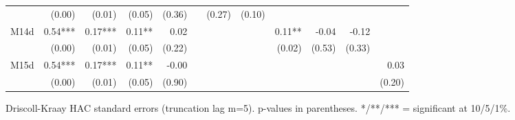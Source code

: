 \begin{table}[htbp]
{\begin{tabular}{lrrrrrrrrrrr}
 & (0.00) & (0.01) & (0.05) & (0.36) &  & (0.27) & (0.10) &  &  &  &  \\
M14d & 0.54*** & 0.17*** & 0.11** & 0.02 &  &  &  & 0.11** & -0.04 & -0.12 &  \\
 & (0.00) & (0.01) & (0.05) & (0.22) &  &  &  & (0.02) & (0.53) & (0.33) &  \\
M15d & 0.54*** & 0.17*** & 0.11** & -0.00 &  &  &  &  &  &  & 0.03 \\
 & (0.00) & (0.01) & (0.05) & (0.90) &  &  &  &  &  &  & (0.20) \\
\bottomrule
\end{tabular}%
}
\smallskip
\small
\noindent Driscoll-Kraay HAC standard errors (truncation lag m=5). p-values in parentheses. */**/*** = significant at 10/5/1\%.
\end{table}